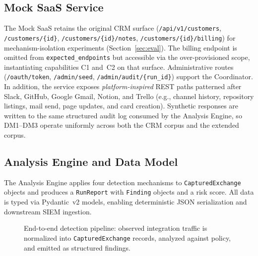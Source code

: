 \documentclass[conference]{IEEEtran}
\begin{document}
\subsection{Mock SaaS Service}

The Mock SaaS retains the original CRM surface
(\texttt{/api/v1/customers}, \texttt{/customers/\{id\}},
\texttt{/customers/\{id\}/notes}, \texttt{/customers/\{id\}/billing})
for mechanism-isolation experiments (Section~\ref{sec:eval}).
The billing endpoint is omitted from \texttt{expected\_endpoints} but
accessible via the over-provisioned scope, instantiating capabilities
C1 and~C2 on that surface.
Administrative routes (\texttt{/oauth/token}, \texttt{/admin/seed},
\texttt{/admin/audit/\{run\_id\}}) support the Coordinator. In
addition, the service exposes \emph{platform-inspired} REST paths
patterned after Slack, GitHub, Google Gmail, Notion, and Trello (e.g.,
channel history, repository listings, mail send, page updates, and
card creation). Synthetic responses are written to the same structured
audit log consumed by the Analysis Engine, so DM1--DM3 operate
uniformly across both the CRM corpus and the extended corpus.

\subsection{Analysis Engine and Data Model}

The Analysis Engine applies four detection mechanisms to
\texttt{CapturedExchange} objects and produces a \texttt{RunReport}
with \texttt{Finding} objects and a risk score. All data is typed via
Pydantic~v2 models, enabling deterministic JSON serialization and
downstream SIEM ingestion.

\begin{figure}[htbp]
  \centering
  \caption{End-to-end detection pipeline: observed integration traffic is
  normalized into \texttt{CapturedExchange} records, analyzed against
  policy, and emitted as structured findings.}
  \label{fig:pipeline}
\end{figure}
\end{document}
